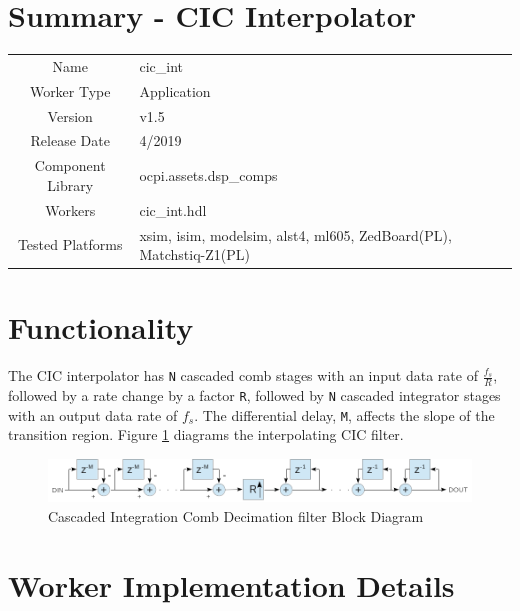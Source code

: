 \documentclass{article}
\author{} %
\date{Version \docVersion} %
\title{\docTitle}
\def\docVersion{1.5}
\def\comp{cic\_int}
\def\Comp{CIC Interpolator}
\def\importpath{../../cic_dec.test/doc/}
\begin{document}
\section*{Summary - \Comp}
\begin{tabular}{|c|M{13.5cm}|}
	\hline
	                  &                                                    \\
	\hline
	Name              & \comp                                              \\
	\hline
	Worker Type       & Application                                        \\
	\hline
	Version           & v\docVersion \\
	\hline
	Release Date      & 4/2019 \\
	\hline
	Component Library & ocpi.assets.dsp\_comps                              \\
	\hline
	Workers           & \comp.hdl                                          \\
	\hline
	Tested Platforms  & xsim, isim, modelsim, alst4, ml605, ZedBoard(PL), Matchstiq-Z1(PL) \\
	\hline
\end{tabular}

\section*{Functionality}
\begin{flushleft}
	The CIC interpolator has \verb+N+ cascaded comb stages with an input data rate of $\frac{f_{s}}{R}$, followed by a rate change by a factor \verb+R+, followed by \verb+N+ cascaded integrator stages with an output data rate of $f_{s}$. The differential delay, \verb+M+, affects the slope of the transition region. Figure \ref{fig:cic} diagrams the interpolating CIC filter.

	\begin{figure}[ht]
		\centering
		\includegraphics[scale=.6]{cic_interpolator_block_diagram}
		\caption{Cascaded Integration Comb Decimation filter Block Diagram}
		\label{fig:cic}
	\end{figure}
\end{flushleft}

\section*{Worker Implementation Details}


\end{document}
